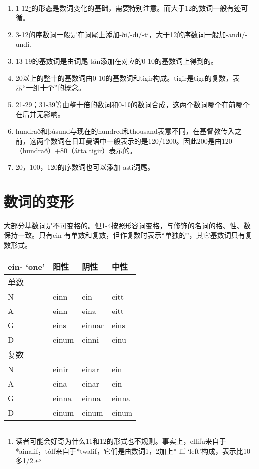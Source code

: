 {{\begin{enumerate}
  \def\labelenumi{\arabic{enumi})}
  \item
        1-12\footnote{读者可能会好奇为什么11和12的形式也不规则。事实上，ellifu来自于*ainalif，tólf来自于*twalif，它们是由数词1，2加上*-lif
          `left'构成，表示比10多1/2.}的形态是数词变化的基础，需要特别注意。而大于12的数词一般有迹可循。
  \item
        3-12的序数词一般是在词尾上添加-ði/-di/-ti，大于12的序数词一般加-andi/-undi.
  \item
        13-19的基数词是由词尾-tán添加在对应的0-10的基数词上得到的。
  \item
        20以上的整十的基数词由0-10的基数词和tigir构成。tigir是tigr的复数，表示``一组十个''的概念。
  \item
        21-29；31-39等由整十倍的数词和0-10的数词合成，这两个数词哪个在前哪个在后并无影响。
  \item
        hundrað和þúsund与现在的hundred和thousand表意不同，在基督教传入之前，这两个数词在日耳曼语中一般表示的是120/1200。因此200是由120（hundrað）+80（átta
        tigir）表示的。
  \item
        20，100，120的序数词也可以添加-asti词尾。
\end{enumerate}

\section{数词的变形}\label{数词的变形}

大部分基数词是不可变格的。但1-4按照形容词变格，与修饰的名词的格、性、数保持一致。只有ein-有单数和复数，但作复数时表示``单独的''，其它基数词只有复数形式。

\begin{longtable}{llll}
  \toprule
  ein- `one‌' & 阳性  & 阴性   & 中性  \\
  \midrule
  \endhead
  \bottomrule
  \endfoot
  单数       &       &        &       \\
  N          & einn  & ein    & eitt  \\
  A          & einn  & eina   & eitt  \\
  G          & eins  & einnar & eins  \\
  D          & einum & einni  & einu  \\
  复数       &       &        &       \\
  N          & einir & einar  & ein   \\
  A          & eina  & einar  & ein   \\
  G          & einna & einna  & einna \\
  D          & einum & einum  & einum \\
\end{longtable}

}}

